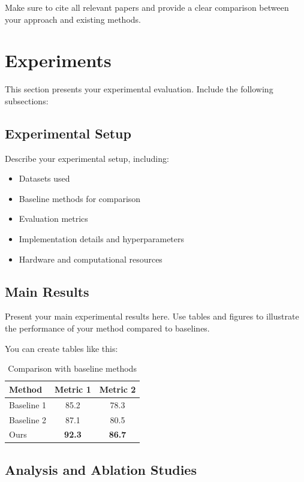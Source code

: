 \documentclass[10pt, a4paper, logo]{googledeepmind}
\newcommand{\best}[1]{\cellcolor{BestColor}\textbf{#1}}
\begin{document}
Make sure to cite all relevant papers and provide a clear comparison between your approach and existing methods.

\section{Experiments}
\label{sec:experiments}

This section presents your experimental evaluation. Include the following subsections:

\subsection{Experimental Setup}

Describe your experimental setup, including:
\begin{itemize}
    \item Datasets used
    \item Baseline methods for comparison
    \item Evaluation metrics
    \item Implementation details and hyperparameters
    \item Hardware and computational resources
\end{itemize}

\subsection{Main Results}

Present your main experimental results here. Use tables and figures to illustrate the performance of your method compared to baselines.

You can create tables like this:

\begin{table}[h]
\centering
\caption{Comparison with baseline methods}
\label{tab:main_results}
\begin{tabular}{lcc}
\toprule
Method & Metric 1 & Metric 2 \\
\midrule
Baseline 1 & 85.2 & 78.3 \\
Baseline 2 & 87.1 & 80.5 \\
Ours & \best{92.3} & \best{86.7} \\
\bottomrule
\end{tabular}
\end{table}

\subsection{Analysis and Ablation Studies}
\end{document}
